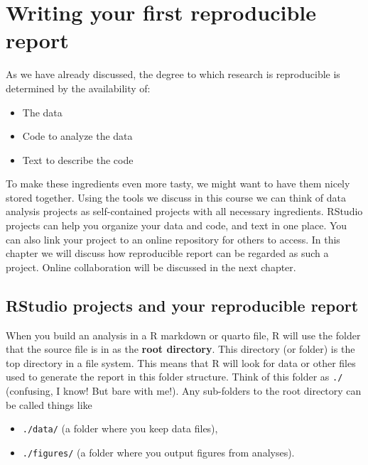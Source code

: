 \documentclass[
  11pt,
  letterpaper,
]{scrbook}
\providecommand{\tightlist}{%
  \setlength{\itemsep}{0pt}\setlength{\parskip}{0pt}}\usepackage{longtable,booktabs,array}
\begin{document}

\hypertarget{writing-your-first-reproducible-report}{%
\chapter{Writing your first reproducible
report}\label{writing-your-first-reproducible-report}}

As we have already discussed, the degree to which research is
reproducible is determined by the availability of:

\begin{itemize}
\tightlist
\item
  The data
\item
  Code to analyze the data
\item
  Text to describe the code
\end{itemize}

To make these ingredients even more tasty, we might want to have them
nicely stored together. Using the tools we discuss in this course we can
think of data analysis projects as self-contained projects with all
necessary ingredients. RStudio projects can help you organize your data
and code, and text in one place. You can also link your project to an
online repository for others to access. In this chapter we will discuss
how reproducible report can be regarded as such a project. Online
collaboration will be discussed in the next chapter.

\hypertarget{rstudio-projects-and-your-reproducible-report}{%
\section{RStudio projects and your reproducible
report}\label{rstudio-projects-and-your-reproducible-report}}

When you build an analysis in a R markdown or quarto file, R will use
the folder that the source file is in as the \textbf{root directory}.
This directory (or folder) is the top directory in a file system. This
means that R will look for data or other files used to generate the
report in this folder structure. Think of this folder as \texttt{./}
(confusing, I know! But bare with me!). Any sub-folders to the root
directory can be called things like

\begin{itemize}
\tightlist
\item
  \texttt{./data/} (a folder where you keep data files),
\item
  \texttt{./figures/} (a folder where you output figures from analyses).
\end{itemize}
\end{document}
